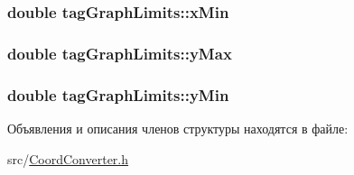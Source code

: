 \hypertarget{structtag_graph_limits_a066cde124b9855d3ebde544f671885ed}{
\subsubsection[{x\-Min}]{\setlength{\rightskip}{0pt plus 5cm}double tag\-Graph\-Limits\-::x\-Min}}\label{structtag_graph_limits_a066cde124b9855d3ebde544f671885ed}
\hypertarget{structtag_graph_limits_a55e1c7ce08e09341369609becb48ecae}{
\subsubsection[{y\-Max}]{\setlength{\rightskip}{0pt plus 5cm}double tag\-Graph\-Limits\-::y\-Max}}\label{structtag_graph_limits_a55e1c7ce08e09341369609becb48ecae}
\hypertarget{structtag_graph_limits_a7e29c3537c44a32d136d9876d53aa494}{
\subsubsection[{y\-Min}]{\setlength{\rightskip}{0pt plus 5cm}double tag\-Graph\-Limits\-::y\-Min}}\label{structtag_graph_limits_a7e29c3537c44a32d136d9876d53aa494}


Объявления и описания членов структуры находятся в файле\-:\begin{DoxyCompactItemize}
\item 
src/\hyperlink{_coord_converter_8h}{Coord\-Converter.\-h}\end{DoxyCompactItemize}
